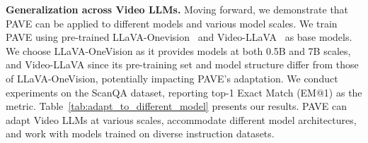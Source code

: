 \begin{table}[t]  
\centering  
{}
\vspace{-1mm}
\caption{\textbf{Ablation study} on the design of PAVE on 3DQA ScanQA benchmark. We report the Top-1 Exact Match score, FLOPs, and the number of trainable parameters. 
\vspace{-2mm}
}  
\label{tab:adptor_design}  
\end{table}  

\medskip
\noindent\textbf{Generalization across Video LLMs.}
Moving forward, we demonstrate that PAVE can be applied to different models and various model scales.
We train PAVE using pre-trained LLaVA-Onevision~\cite{li2024llava} and Video-LLaVA~\cite{lin2023video} as base models. 
We choose LLaVA-OneVision as it provides models at both 0.5B and 7B scales, and Video-LLaVA since its pre-training set and model structure differ from those of LLaVA-OneVision, potentially impacting PAVE's adaptation. 
We conduct experiments on the ScanQA dataset, reporting top-1 Exact Match (EM@1) as the metric.
Table~\ref{tab:adapt_to_different_model} presents our results. PAVE can adapt Video LLMs at various scales, accommodate different model architectures, and work with models trained on diverse instruction datasets.


